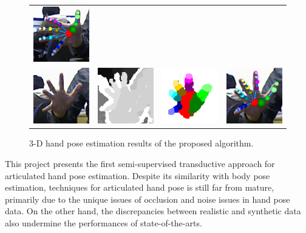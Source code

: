 \documentclass[10pt, a4paper]{article}
\begin{document}
\begin{figure}[!ht]
\begin{tabular}{cccc}
		\includegraphics[width=2.7cm]{fig/hand/qual/vote/image_0520.png}
		\label{fig/hand/multi2} \\
		\includegraphics[width=2.7cm]{fig/hand/qual/rgb/image_0996.png} &
		\includegraphics[width=2.7cm]{fig/hand/qual/depth/image_0996.png} &
		\includegraphics[width=2.7cm]{fig/hand/qual/class/class-996.png} &
		\includegraphics[width=2.7cm]{fig/hand/qual/vote/image_0996.png}
		\label{fig/hand/multi5} \\ 
	\end{tabular}
	\caption{3-D hand pose estimation results of the proposed algorithm. }
\end{figure} 

This project presents the first semi-supervised transductive approach for articulated hand pose estimation.  
Despite its similarity with body pose estimation, techniques for articulated hand pose is still far from mature, primarily due to the unique issues of occlusion and noise issues in hand pose data. 
On the other hand, the discrepancies between realistic and synthetic data also undermine the performances of state-of-the-arts. 
\end{document}
